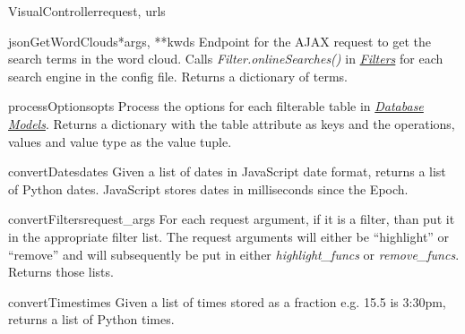 \documentclass[letterpaper,10pt,english]{manual}
\begin{document}
\begin{classdesc}{VisualController}{request, urls}
\hypertarget{webscavator.controllers.visualController.VisualController.jsonGetWordClouds}{}\begin{methoddesc}{jsonGetWordClouds}{*args, **kwds}
Endpoint for the AJAX request to get the search terms in the word cloud.
Calls \emph{Filter.onlineSearches()} in \hyperlink{--doc-filters}{\emph{Filters}} for each search engine in the config file.
Returns a dictionary of terms.
\end{methoddesc}

\hypertarget{webscavator.controllers.visualController.VisualController.processOptions}{}\begin{staticmethoddesc}{processOptions}{opts}
Process the options for each filterable table in \hyperlink{--doc-models}{\emph{Database Models}}. 
Returns a dictionary with the table attribute as keys and the operations, 
values and value type as the value tuple.
\end{staticmethoddesc}
\end{classdesc}

\hypertarget{webscavator.controllers.visualController.convertDates}{}\begin{funcdesc}{convertDates}{dates}
Given a list of dates in JavaScript date format, returns a list of Python dates.
JavaScript stores dates in milliseconds since the Epoch.
\end{funcdesc}

\hypertarget{webscavator.controllers.visualController.convertFilters}{}\begin{funcdesc}{convertFilters}{request\_args}
For each request argument, if it is a filter, than put it in the appropriate filter list.
The request arguments will either be ``highlight'' or ``remove'' and will subsequently be put
in either \emph{highlight\_funcs} or \emph{remove\_funcs}. Returns those lists.
\end{funcdesc}

\hypertarget{webscavator.controllers.visualController.convertTimes}{}\begin{funcdesc}{convertTimes}{times}
Given a list of times stored as a fraction e.g. 15.5 is 3:30pm, returns a list
of Python times.
\end{funcdesc}
\hypertarget{module-webscavator.controllers}{}
\modulesynopsis{}
\end{document}
